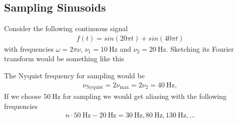 \subsection{Sampling Sinusoids}
Consider the following continuous signal
\begin{align}
    f(t) = sin(20\pi t) + sin(40\pi t)
\end{align}
with frequencies $\omega = 2\pi \nu$, $\nu_1 = 10\ \text{Hz}$ and $\nu_2 = 20\
\text{Hz}$. Sketching its Fourier transform would be something like this
\begin{figure}[H]
    \centering
{}
\end{figure}
The Nyquist frequency for sampling would be
\begin{align}
    \nu_{\text{Nyquist}} = 2\nu_\text{max} = 2\nu_2 = 40\ \text{Hz},
\end{align}
If we choose $50\ \text{Hz}$ for sampling we would get aliasing with the
following frequencies
\begin{align}
    n \cdot 50\ \text{Hz} - 20\ \text{Hz} = 30\ \text{Hz},80\ \text{Hz}, 130\
    \text{Hz}, \dots
\end{align}
